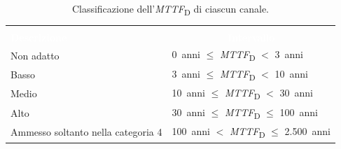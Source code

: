 \begin{table}[ht]
    \centering
    \setlength{\tabcolsep}{4pt}
    \renewcommand{\arraystretch}{1.2}
    \caption{Classificazione dell'\textit{MTTF}\textsubscript{D} di ciascun canale.}
    \label{tab:06-3}
    \begin{tabularx}{\textwidth}{|>{\raggedright\arraybackslash}p{5.2cm}|X|}
        \hline
        \rowcolor{tabblue}
        \multicolumn{2}{|c|}{\textcolor{white}{\textbf{\textit{MTTF}\textsubscript{D} di ciascun canale}}} \\
        \rowcolor{tabblue}
        \textcolor{white}{\textbf{Descrizione}} &
        \multicolumn{1}{c|}{\textcolor{white}{\textbf{Intervallo}}} \\
        \hline
        Non adatto & 0~anni $\leq$ \textit{MTTF}\textsubscript{D} $<$ 3~anni \\
        \hline
        \rowcolor{black!8}
        Basso & 3~anni $\leq$ \textit{MTTF}\textsubscript{D} $<$ 10~anni \\
        \hline
        Medio & 10~anni $\leq$ \textit{MTTF}\textsubscript{D} $<$ 30~anni \\
        \hline
        \rowcolor{black!8}
        Alto & 30~anni $\leq$ \textit{MTTF}\textsubscript{D} $\leq$ 100~anni \\
        \hline
        Ammesso soltanto nella categoria 4 & 100~anni $<$ \textit{MTTF}\textsubscript{D} $\leq$ 2.500~anni \\
        \hline
    \end{tabularx}
\end{table}

